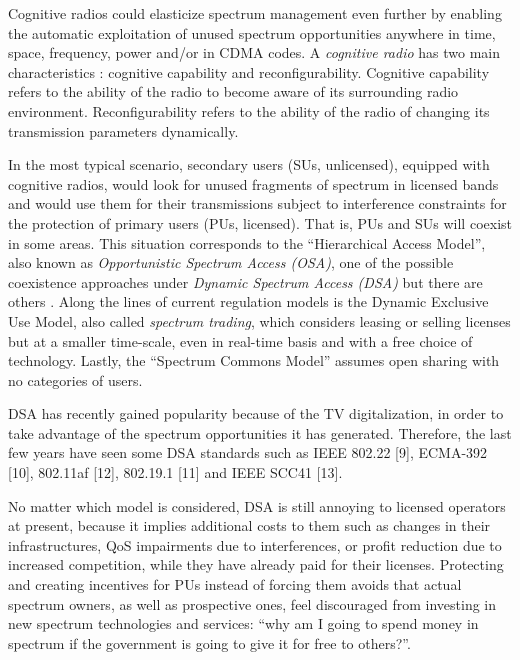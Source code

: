 Cognitive radios \cite{ref:Mitola1999} could elasticize spectrum management even further by enabling the automatic exploitation of unused spectrum opportunities anywhere in time, space, frequency, power and/or in CDMA codes.
A \emph{cognitive radio} has two main characteristics \cite{ref:Akyildiz2006}: cognitive capability and reconfigurability. 
Cognitive capability refers to the ability of the radio to become aware of its surrounding radio environment. Reconfigurability refers to the ability of the radio of changing its transmission parameters dynamically.

In the most typical scenario, secondary users (SUs, unlicensed), equipped with cognitive radios, would look for unused fragments of spectrum in licensed bands and would use them for their transmissions subject to interference constraints for the protection of primary users (PUs, licensed). That is, PUs and SUs will coexist in some areas.
This situation corresponds to the “Hierarchical Access Model”, also known as \emph{Opportunistic Spectrum Access (OSA)}, one of the possible coexistence approaches under \emph{Dynamic Spectrum Access (DSA)} but there are others \cite{ref:Zhao2007_sur}. 
Along the lines of current regulation models is the Dynamic Exclusive Use Model, also called \emph{spectrum trading}, which considers leasing or selling licenses but at a smaller time-scale, even in real-time basis and with a free choice of technology.
Lastly, the “Spectrum Commons Model”  assumes open sharing with no categories of users.

DSA has recently gained popularity because of the TV digitalization, in order to take advantage of the spectrum opportunities it has generated. %
Therefore, the last few years have seen some DSA standards such as IEEE 802.22 [9], ECMA-392 [10], 802.11af [12], 802.19.1 [11] and IEEE SCC41 [13].

No matter which model is considered, DSA is still annoying to licensed operators at present, because it implies additional costs to them such as changes in their infrastructures, QoS impairments due to interferences, or profit reduction due to increased competition, while they have already paid for their licenses. %
Protecting and creating incentives for PUs instead of forcing them avoids that actual spectrum owners, as well as prospective ones, feel discouraged from investing in new spectrum technologies and services: \enquote{why am I going to spend money in spectrum if the government is going to give it for free to others?}.


